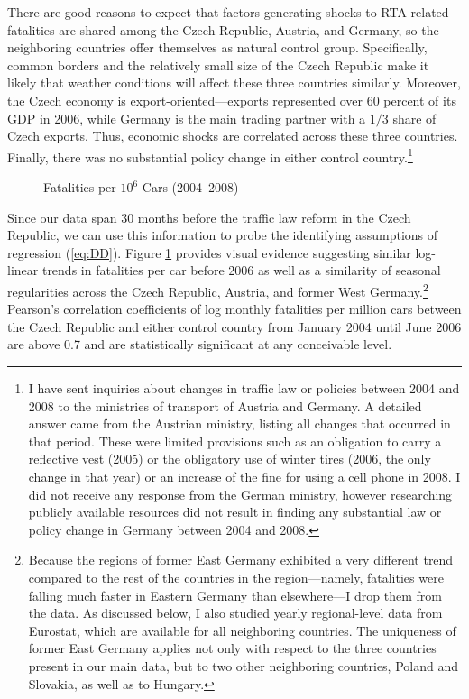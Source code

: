 \documentclass[12pt]{article}
\begin{document}
There are good reasons to expect that factors generating shocks to RTA-related
fatalities are shared among the Czech Republic, Austria, and Germany, so the
neighboring countries offer themselves as natural control group. Specifically,
common borders and the relatively small size of the Czech Republic make it
likely that weather conditions will affect these three countries similarly.
Moreover, the Czech economy is export-oriented---exports represented over 60
percent of its GDP in 2006, while Germany is the main trading partner with a
$1/3$ share of Czech exports.  Thus, economic shocks are correlated across these
three countries.  Finally, there was no substantial policy change in either
control country.\footnote{I have sent inquiries about changes in traffic law or
  policies between 2004 and 2008 to the ministries of transport of Austria and
  Germany. A detailed answer came from the Austrian ministry, listing all
  changes that occurred in that period. These were limited provisions such as an
  obligation to carry a reflective vest (2005) or the obligatory use of winter
  tires (2006, the only change in that year) or an increase of the fine for
  using a cell phone in 2008. I did not receive any response from the German
  ministry, however researching publicly available resources did not result in
  finding any substantial law or policy change in Germany between 2004 and
  2008.} 

\begin{figure}[t]
  \caption{Fatalities per $10^6$ Cars (2004--2008)} 
  \label{fig:fatalcar}
\end{figure}

Since our data span 30 months before the traffic law reform in the Czech
Republic, we can use this information to probe the identifying assumptions of
regression (\ref{eq:DD}). Figure \ref{fig:fatalcar} provides visual evidence
suggesting similar log-linear trends in fatalities per car before 2006 as well
as a similarity of seasonal regularities across the Czech Republic, Austria, and
former West Germany.\footnote{\label{fn:DDR}Because the regions of former East
  Germany exhibited a very different trend compared to the rest of the countries
  in the region---namely, fatalities were falling much faster in Eastern Germany
  than elsewhere---I drop them from the data. As discussed below, I also studied
  yearly regional-level data from Eurostat, which are available for all
  neighboring countries. The uniqueness of former East Germany applies not only
  with respect to the three countries present in our main data, but to two other
  neighboring countries, Poland and Slovakia, as well as to Hungary.}  Pearson's
correlation coefficients of log monthly fatalities per million cars between the
Czech Republic and either control country from January 2004 until June 2006 are
above 0.7 and are statistically significant at any conceivable level.
\end{document}
